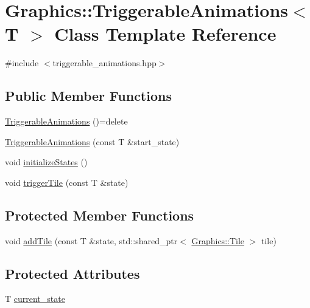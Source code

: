 \hypertarget{class_graphics_1_1_triggerable_animations}{}\section{Graphics\+:\+:Triggerable\+Animations$<$ T $>$ Class Template Reference}
\label{class_graphics_1_1_triggerable_animations}


{\ttfamily \#include $<$triggerable\+\_\+animations.\+hpp$>$}

\subsection*{Public Member Functions}
\begin{DoxyCompactItemize}
\item 
\hyperlink{class_graphics_1_1_triggerable_animations_a7efd5e939bef5de77f720f1e5b1114fe}{Triggerable\+Animations} ()=delete
\item 
\hyperlink{class_graphics_1_1_triggerable_animations_a8a2e951c4d6897ce273da003de9585ab}{Triggerable\+Animations} (const T \&start\+\_\+state)
\item 
void \hyperlink{class_graphics_1_1_triggerable_animations_a21d79b645121d0d316cae1112bddbce4}{initialize\+States} ()
\item 
void \hyperlink{class_graphics_1_1_triggerable_animations_ae34239042915beccc4c912f28a1d83e0}{trigger\+Tile} (const T \&state)
\end{DoxyCompactItemize}
\subsection*{Protected Member Functions}
\begin{DoxyCompactItemize}
\item 
void \hyperlink{class_graphics_1_1_triggerable_animations_ad7b21d0e24cfeb6279b91be187ddf2d1}{add\+Tile} (const T \&state, std\+::shared\+\_\+ptr$<$ \hyperlink{class_graphics_1_1_tile}{Graphics\+::\+Tile} $>$ tile)
\end{DoxyCompactItemize}
\subsection*{Protected Attributes}
\begin{DoxyCompactItemize}
\item 
T \hyperlink{class_graphics_1_1_triggerable_animations_a0f0e18726e1132c73d2e1d9f99072af1}{current\+\_\+state}
\end{DoxyCompactItemize}
